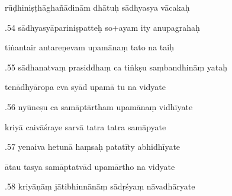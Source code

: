 \documentclass[article,12pt,a4paper]{memoir}%
\newcounter{parCount}
\begin{document}
	  
	  \pstart \leavevmode%
	rūḍhiniṣṭhāghañādinām dhātuḥ sādhyasya vācakaḥ 
	{}
	\pend%
      

	  
	  \pstart {}.54 sādhyasyāpariniṣpatteḥ so+ayam ity anupagrahaḥ 
	{}
	\pend%
      

	  
	  \pstart \leavevmode%
	tiṅantair antareṇevam upamānaṃ tato na taiḥ 
	{}
	\pend%
      

	  
	  \pstart {}.55 sādhanatvaṃ prasiddhaṃ ca tiṅkṣu saṃbandhināṃ yataḥ 
	{}
	\pend%
      

	  
	  \pstart \leavevmode%
	tenādhyāropa eva syād upamā tu na vidyate 
	{}
	\pend%
      

	  
	  \pstart {}.56 nyūneṣu ca samāptārtham upamānaṃ vidhīyate 
	{}
	\pend%
      

	  
	  \pstart \leavevmode%
	kriyā caivāśraye sarvā tatra tatra samāpyate 
	{}
	\pend%
      

	  
	  \pstart {}.57 yenaiva hetunā haṃsaḥ patatīty abhidhīyate 
	{}
	\pend%
      

	  
	  \pstart \leavevmode%
	ātau tasya samāptatvād upamārtho na vidyate 
	{}
	\pend%
      

	  
	  \pstart {}.58 kriyāṇāṃ jātibhinnānāṃ sādṛśyaṃ nāvadhāryate 
	{}
	\pend%
      
\end{document}
